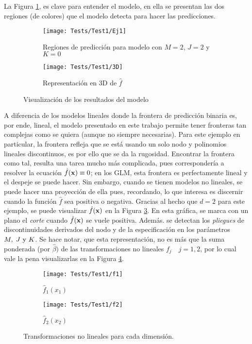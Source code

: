 \documentclass[../Main/Main.tex]{subfiles}
\begin{document}
La Figura \ref{fig:Test1Ej1}, es clave para entender el modelo, en ella se presentan las dos regiones (de colores) que el modelo detecta para hacer las predicciones.
\begin{figure}[h]
	\centering
	\begin{subfigure}[b]{0.45\textwidth}
    	\texttt{[image: Tests/Test1/Ej1]}
		\caption{Regiones de predicción para modelo con $M = 2$, $J = 2$ y $K = 0$}
	\label{fig:Test1Ej1}
	\end{subfigure}
	\hfill    
    \begin{subfigure}[b]{0.45\textwidth}
        \texttt{[image: Tests/Test1/3D]}
        \caption{Representación en 3D de $\hat{f}$}
        \label{fig:Test1Ej13D}
    \end{subfigure}
    \caption{Visualización de los resultados del modelo}
\end{figure}
A diferencia de los modelos lineales donde la frontera de predicción binaria es, por ende, lineal, el modelo presentado en este trabajo permite tener fronteras tan complejas como se quiera (aunque no siempre necesarias). Para este ejemplo en particular, la frontera refleja que se está usando un solo nodo y polinomios lineales discontinuos, es por ello que se da la rugosidad. Encontrar la frontera como tal, resulta una tarea mucho más complicada, pues correspondería a resolver la ecuación  $\hat{f}(\mathbf{x}) \equiv 0$; en los GLM, esta frontera es perfectamente lineal y el despeje se puede hacer. Sin embargo, cuando se tienen modelos no lineales, se puede hacer una proyección de ella pues, recordando, lo que interesa es discernir cuando la función $\hat{f}$ sea positiva o negativa. Gracias al hecho que $d = 2$ para este ejemplo, se puede visualizar $\hat{f}(\mathbf{x})$ en la Figura \ref{fig:Test1Ej13D}. En esta gráfica, se marca con un plano el \textit{corte} cuando $\hat{f}(\mathbf{x})$ se vuele positiva. Además. se detectan los \textit{pliegues} de discontinuidades derivados del nodo y de la especificación en los parámetros $M,\;J\text{ y }K$. Se hace notar, que esta representación, no es más que la suma ponderada (por $\hat{\beta})$ de las transformaciones no lineales $f_j \quad j=1,2$, por lo cual vale la pena visualizarlas en la Figura \ref{fig:Test1Ej1Fs}. \\
\begin{figure}[h]
    \begin{subfigure}[b]{0.45\textwidth}
        \texttt{[image: Tests/Test1/f1]}
        \caption{$\hat{f}_1(x_1)$}
    \end{subfigure}
	\hfill
	    \begin{subfigure}[b]{0.45\textwidth}
        \texttt{[image: Tests/Test1/f2]}
        \caption{$\hat{f}_2(x_2)$}
    \end{subfigure}
    \caption{Transformaciones no lineales para cada dimensión.}\label{fig:Test1Ej1Fs}
\end{figure}
\end{document}
